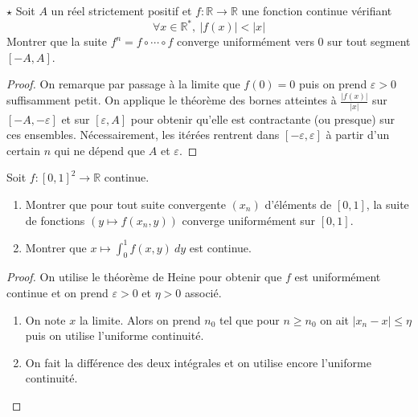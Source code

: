 \documentclass[french,a4paper]{article}
\newcommand{\R}{\mathbb{R}}
\newcommand{\st}{^*}
\theoremstyle{plain}
\theoremstyle{definition}
\theoremstyle{remark}
\begin{document}
\begin{ex}{$\star$}
	Soit $A$ un réel strictement positif et $f:\R\to\R$ une fonction continue vérifiant $$\forall x\in\R\st,\ \lvert f(x)\rvert<\lvert x\rvert$$ Montrer que la suite $f^n=f\circ \cdots\circ f$ converge uniformément vers $0$ sur tout segment $[-A,A]$.
\end{ex}
\begin{proof}
	On remarque par passage à la limite que $f(0)=0$ puis on prend $\varepsilon>0$ suffisamment petit. On applique le théorème des bornes atteintes à $\displaystyle\frac{\lvert f(x)\rvert}{\lvert x\rvert}$ sur $[-A,-\varepsilon]$ et sur $[\varepsilon,A]$ pour obtenir qu'elle est contractante (ou presque) sur ces ensembles. Nécessairement, les itérées rentrent dans $[-\varepsilon,\varepsilon]$ à partir d'un certain $n$ qui ne dépend que $A$ et $\varepsilon$.
\end{proof}

\begin{ex}{}
	Soit $f:[0,1]^2\to\R$ continue.
	\begin{enumerate}
		\item Montrer que pour tout suite convergente $(x_n)$ d'éléments de $[0,1]$, la suite de fonctions $(y\mapsto f(x_n,y))$ converge uniformément sur $[0,1]$.
		\item Montrer que $x\mapsto\displaystyle\int_{0}^{1}f(x,y)\ dy$ est continue.
	\end{enumerate}
\end{ex}
\begin{proof}
	On utilise le théorème de Heine pour obtenir que $f$ est uniformément continue et on prend $\varepsilon>0$ et $\eta>0$ associé.
	\begin{enumerate}
		\item On note $x$ la limite. Alors on prend $n_0$ tel que pour $n\geqslant n_0$ on ait $\lvert x_n-x\rvert\leqslant\eta$ puis on utilise l'uniforme continuité.
		\item On fait la différence des deux intégrales et on utilise encore l'uniforme continuité.
	\end{enumerate}
\end{proof}
\end{document}
